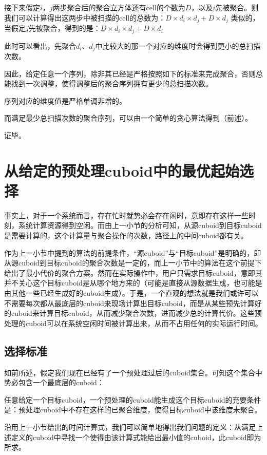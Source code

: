 接下来假定$i$，$j$两步聚合后的聚合立方体还有cell的个数为$D$，以及$i$先被聚合。则我们可以计算得出这两步中被扫描的cell的总数为：$D \times d_i \times d_j + D \times d_j$ 
类似的，当假定$j$先被聚合，得到的是：$D \times d_i \times d_j + D \times d_i$

此时可以看出，先聚合$d_i$、$d_j$中比较大的那一个对应的维度时会得到更小的总扫描次数。

因此，给定任意一个序列，除非其已经是严格按照如下的标准来完成聚合，否则总能找到一次调整，使得调整后的聚合序列拥有更少的总扫描次数。

{\quad}序列对应的维度值是严格单调非增的。

而满足最少总扫描次数的聚合序列，可以由一个简单的贪心算法得到（前述）。

证毕。

\section{从给定的预处理cuboid中的最优起始选择}
事实上，对于一个系统而言，存在忙时就势必会存在闲时，意即存在这样一些时刻，系统计算资源得到空闲。而由上一小节的分析可知，从源cuboid到目标cuboid是需要计算的，这个计算量与聚合操作的次数，路径上的中间cuboid都有关。

作为上一小节中提到的算法的前提条件，“源cuboid”与“目标cuboid”是明确的，即从源cuboid到目标cuboid的聚合次数是一定的，而上一小节中的算法在这个前提下给出了最小代价的聚合方案。然而在实际操作中，用户只需求目标cuboid，意即其并不关心这个目标cuboid是从哪个地方来的（可能是直接从源数据生成，也可能是由其他一些已经生成好的cuboid生成）。于是，一个直观的想法就是我们或许可以不需要每次都从最底层的cuboid来现场计算出目标cuboid，而是从某些预先计算好的cuboid来计算目标cuboid，从而减少聚合次数，进而减少总的计算代价。这些预处理的cuboid可以在系统空闲时间被计算出来，从而不占用任何的实际运行时间。

\subsection{选择标准}
如前所述，假定我们现在已经有了一个预处理过后的cuboid集合。可知这个集合中势必包含一个最底层的cuboid：

\begin{definition}
任意给定一个目标cuboid，一个预处理的cuboid能生成这个目标cuboid的充要条件是：预处理cuboid中不存在这样的已聚合维度，使得目标cuboid中该维度未聚合。
\end{definition}

沿用上一小节给出的时间计算式，我们可以简单地得出我们问题的定义：从满足上述定义的cuboid中寻找一个使得由该计算式能给出最小值的cuboid，此cuboid即为所求。

